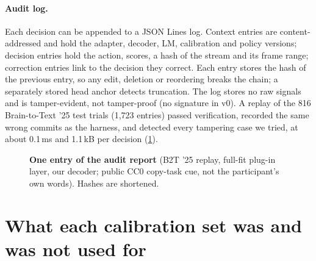 \paragraph{Audit log.} Each decision can be appended to a JSON Lines log. Context entries are content-addressed and hold the adapter, decoder, LM, calibration and policy versions; decision entries hold the action, scores, a hash of the stream and its frame range; correction entries link to the decision they correct. Each entry stores the hash of the previous entry, so any edit, deletion or reordering breaks the chain; a separately stored head anchor detects truncation. The log stores no raw signals and is tamper-evident, not tamper-proof (no signature in v0). A replay of the 816 Brain-to-Text '25 test trials (1,723 entries) passed verification, recorded the same wrong commits as the harness, and detected every tampering case we tried, at about 0.1\,ms and 1.1\,kB per decision (\cref{fig:audit}).

\begin{figure}[H]
  \centering
  \caption{\textbf{One entry of the audit report} (B2T '25 replay, full-fit plug-in layer, our decoder; public CC0 copy-task cue, not the participant's own words). Hashes are shortened.}
  \label{fig:audit}
\end{figure}

\section{What each calibration set was and was not used for}
\label{app:separate}

